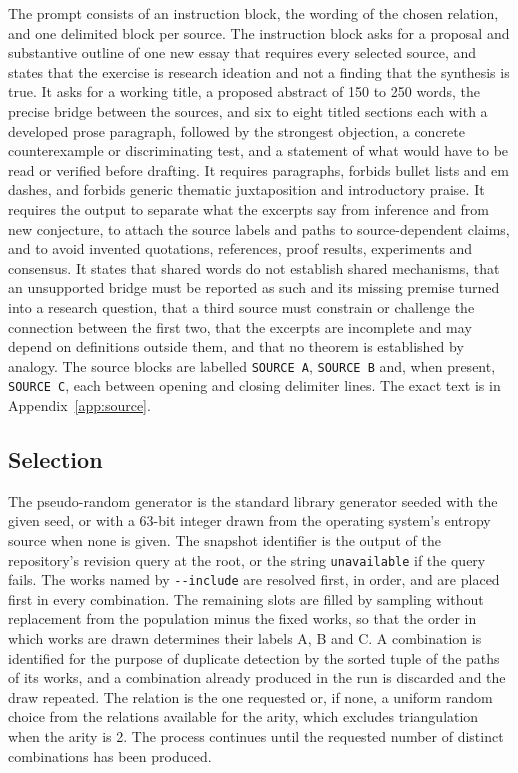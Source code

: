 \documentclass[11pt]{article}
\begin{document}
The prompt consists of an instruction block, the wording of the chosen relation, and one delimited block per source. The instruction block asks for a proposal and substantive outline of one new essay that requires every selected source, and states that the exercise is research ideation and not a finding that the synthesis is true. It asks for a working title, a proposed abstract of 150 to 250 words, the precise bridge between the sources, and six to eight titled sections each with a developed prose paragraph, followed by the strongest objection, a concrete counterexample or discriminating test, and a statement of what would have to be read or verified before drafting. It requires paragraphs, forbids bullet lists and em dashes, and forbids generic thematic juxtaposition and introductory praise. It requires the output to separate what the excerpts say from inference and from new conjecture, to attach the source labels and paths to source-dependent claims, and to avoid invented quotations, references, proof results, experiments and consensus. It states that shared words do not establish shared mechanisms, that an unsupported bridge must be reported as such and its missing premise turned into a research question, that a third source must constrain or challenge the connection between the first two, that the excerpts are incomplete and may depend on definitions outside them, and that no theorem is established by analogy. The source blocks are labelled \texttt{SOURCE A}, \texttt{SOURCE B} and, when present, \texttt{SOURCE C}, each between opening and closing delimiter lines. The exact text is in Appendix~\ref{app:source}.

\subsection{Selection}

The pseudo-random generator is the standard library generator seeded with the given seed, or with a 63-bit integer drawn from the operating system's entropy source when none is given. The snapshot identifier is the output of the repository's revision query at the root, or the string \texttt{unavailable} if the query fails. The works named by \texttt{-{}-include} are resolved first, in order, and are placed first in every combination. The remaining slots are filled by sampling without replacement from the population minus the fixed works, so that the order in which works are drawn determines their labels A, B and C. A combination is identified for the purpose of duplicate detection by the sorted tuple of the paths of its works, and a combination already produced in the run is discarded and the draw repeated. The relation is the one requested or, if none, a uniform random choice from the relations available for the arity, which excludes triangulation when the arity is 2. The process continues until the requested number of distinct combinations has been produced.
\end{document}
